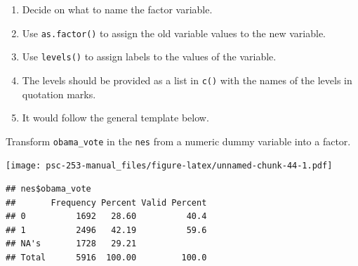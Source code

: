 \documentclass[
]{book}
\newenvironment{Shaded}{\begin{snugshade}}{\end{snugshade}}
\newcommand{\CommentTok}[1]{\textcolor[rgb]{0.56,0.35,0.01}{\textit{#1}}}
\newcommand{\FunctionTok}[1]{\textcolor[rgb]{0.00,0.00,0.00}{#1}}
\newcommand{\NormalTok}[1]{#1}
\newcommand{\OtherTok}[1]{\textcolor[rgb]{0.56,0.35,0.01}{#1}}
\newcommand{\SpecialCharTok}[1]{\textcolor[rgb]{0.00,0.00,0.00}{#1}}
\newcommand{\StringTok}[1]{\textcolor[rgb]{0.31,0.60,0.02}{#1}}
\providecommand{\tightlist}{%
  \setlength{\itemsep}{0pt}\setlength{\parskip}{0pt}}
\begin{document}
\begin{enumerate}
\def\labelenumi{\arabic{enumi}.}
\tightlist
\item
  Decide on what to name the factor variable.
\item
  Use \texttt{as.factor()} to assign the old variable values to the new variable.
\item
  Use \texttt{levels()} to assign labels to the values of the variable.
\item
  The levels should be provided as a list in \texttt{c()} with the names of the levels in quotation marks.
\item
  It would follow the general template below.
\end{enumerate}

\begin{Shaded}
\end{Shaded}

Transform \texttt{obama\_vote} in the \texttt{nes} from a numeric dummy variable into a factor.

\begin{Shaded}
\end{Shaded}

\texttt{[image: psc-253-manual\_files/figure-latex/unnamed-chunk-44-1.pdf]}

\begin{verbatim}
## nes$obama_vote 
##       Frequency Percent Valid Percent
## 0          1692   28.60          40.4
## 1          2496   42.19          59.6
## NA's       1728   29.21              
## Total      5916  100.00         100.0
\end{verbatim}
\end{document}
